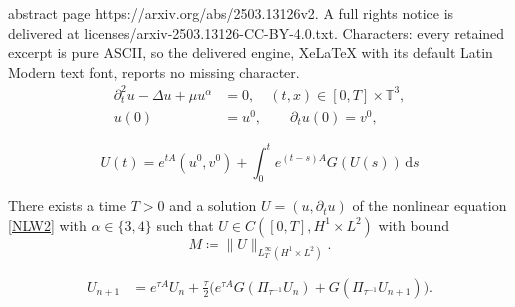 \documentclass[10pt,a4paper]{amsart}
\newcommand{\T}{\mathbb{T}} %
\newcommand{\dd}{\, \mathrm{d}}
\begin{document}
abstract page https://arxiv.org/abs/2503.13126v2. A full rights notice is delivered at licenses/arxiv-2503.13126-CC-BY-4.0.txt. Characters: every retained excerpt is pure ASCII, so the delivered engine, XeLaTeX with its default Latin Modern text font, reports no missing character.
\begin{equation}\begin{aligned} \label{NLW2} \partial_t^2 u -\Delta u +\mu u^{\alpha} &=0  , \quad (t,x) \in [0,T] \times \T^3, \\ 
		u(0)&=u^0, \qquad\partial_tu(0)=v^0,
\end{aligned}\end{equation}

\begin{equation}\label{Duh}
	U(t) = e^{t A }(u^0,v^0)+\int_0^t e^{(t-s)A}G(U(s)) \dd s
\end{equation}

\begin{Assumption}\label{AssNew}
	There exists a time $T>0$ and a solution $U = (u,\partial_tu)$ of the nonlinear equation \eqref{NLW2} with $\alpha \in \{3,4\}$ such that
	{$U \in C([0,T], H^1 \times L^2)$}
	with bound
	\begin{equation}\label{DefMNew}
		M \coloneqq \|U\|_{L^\infty_T( H^1 \times L^2)}.
	\end{equation}
\end{Assumption}

\begin{equation}\label{StrangVar}\begin{aligned}
		U_{n+1} &= e^{\tau A}U_n + \frac{\tau}{2}\Big(e^{\tau A} G(\Pi_{\tau^{-1}}U_n) + G(\Pi_{\tau^{-1}}U_{n+1})\Big).
	\end{aligned}
\end{equation} 
\end{document}
